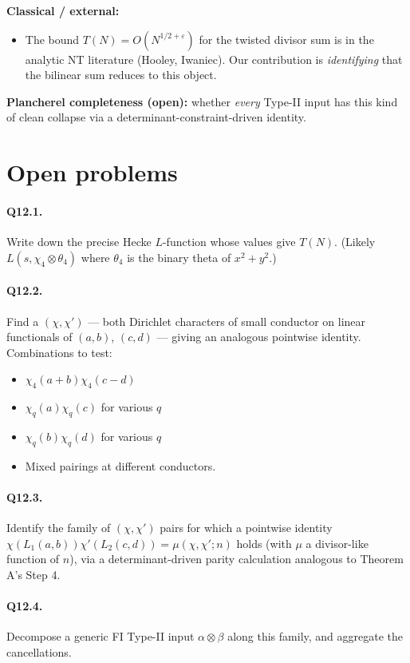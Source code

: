 \documentclass[11pt]{article}
\begin{document}
\textbf{Classical / external:}
\begin{itemize}
\item The bound $T(N) = O(N^{1/2+\varepsilon})$ for the twisted divisor sum is
in the analytic NT literature (Hooley, Iwaniec). Our contribution is
\emph{identifying} that the bilinear sum reduces to this object.
\end{itemize}

\textbf{Plancherel completeness (open):} whether \emph{every} Type-II input has
this kind of clean collapse via a determinant-constraint-driven identity.

\section{Open problems}

\paragraph{Q12.1.} Write down the precise Hecke $L$-function whose values give
$T(N)$. (Likely $L(s, \chi_4 \otimes \theta_4)$ where $\theta_4$ is the binary
theta of $x^2+y^2$.)

\paragraph{Q12.2.} Find a $(\chi, \chi')$ --- both Dirichlet characters of small
conductor on linear functionals of $(a, b)$, $(c, d)$ --- giving an analogous
pointwise identity. Combinations to test:
\begin{itemize}
\item $\chi_4(a+b)\chi_4(c-d)$
\item $\chi_q(a)\chi_q(c)$ for various $q$
\item $\chi_q(b)\chi_q(d)$ for various $q$
\item Mixed pairings at different conductors.
\end{itemize}

\paragraph{Q12.3.} Identify the family of $(\chi, \chi')$ pairs for which a
pointwise identity $\chi(L_1(a,b))\chi'(L_2(c,d)) = \mu(\chi, \chi'; n)$ holds
(with $\mu$ a divisor-like function of $n$), via a determinant-driven parity
calculation analogous to Theorem A's Step 4.

\paragraph{Q12.4.} Decompose a generic FI Type-II input $\alpha \otimes \beta$
along this family, and aggregate the cancellations.
\end{document}
